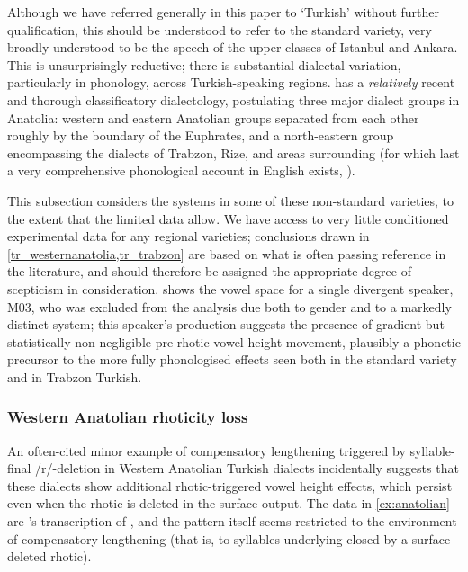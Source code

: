 Although we have referred generally in this paper to `Turkish' without further qualification, this should be understood to refer to the standard variety, very broadly \citep{Lewis1967} understood to be the speech of the upper classes of Istanbul and Ankara. This is unsurprisingly reductive; there is substantial dialectal variation, particularly in phonology, across Turkish-speaking regions. \citet{Karahan1996} has a \emph{relatively} recent and thorough classificatory dialectology, postulating three major dialect groups in Anatolia: western and eastern Anatolian groups separated from each other roughly by the boundary of the Euphrates, and a north-eastern group encompassing the dialects of Trabzon, Rize, and areas surrounding (for which last a very comprehensive phonological account in English exists, \citealt{Brendemoen2002}).

This subsection considers the systems in some of these non-standard varieties, to the extent that the limited data allow. We have access to very little conditioned experimental data for any regional varieties; conclusions drawn in \cref{tr_westernanatolia,tr_trabzon} are based on what is often passing reference in the literature, and should therefore be assigned the appropriate degree of scepticism in consideration.  shows the vowel space for a single divergent speaker, M03, who was excluded from the analysis due both to gender and to a markedly distinct system; this speaker's production suggests the presence of gradient but statistically non-negligible pre-rhotic vowel height movement, plausibly a phonetic precursor to the more fully phonologised effects seen both in the standard variety and in Trabzon Turkish.

\subsubsection{Western Anatolian rhoticity loss}\label{tr_westernanatolia}

An often-cited minor example of compensatory lengthening triggered by syllable-final /r/-deletion \citep{Sezer1986,Kavitskaya2002} in Western Anatolian Turkish dialects incidentally suggests that these dialects show additional rhotic-triggered vowel height effects, which persist even when the rhotic is deleted in the surface output. The data in \cref{ex:anatolian} are \citeauthor{Sezer1986}'s transcription of \citet{Korkmaz1965}, and the pattern itself seems restricted to the environment of compensatory lengthening (that is, to syllables underlying closed by a surface-deleted rhotic).

